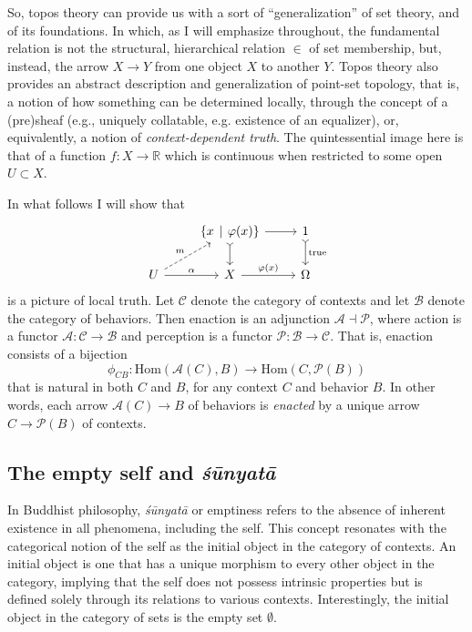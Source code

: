 \documentclass{article}
\begin{document}
So, topos theory can provide us with a sort of ``generalization'' of set theory, and of its foundations. In which, as I will emphasize throughout, the fundamental relation is not the structural, hierarchical relation $\in$ of set membership, but, instead, the arrow $X \to Y$ from one object $X$ to another $Y.$ Topos theory also provides an abstract description and generalization of point-set topology, that is, a notion of how something can be determined locally, through the concept of a (pre)sheaf (e.g., uniquely collatable, e.g. existence of an equalizer), or, equivalently, a notion of \emph{context-dependent truth}. The quintessential image here is that of a function $f \colon X \to \mathbb{R}$ which is continuous when restricted to some open $U \subset X$.

In what follows I will show that  
\[
\begin{tikzcd}
& \{ x \hspace{4px} | \hspace{4px} \varphi(x) \}  \arrow[r] \arrow[d, tail] & 1 \arrow[d, tail, "\text{true}"] \\
U \arrow[r, "\alpha"] \arrow[ru, dashed, "m"] & X \arrow[r, "\varphi(x)"] & \Omega
\end{tikzcd}
\]
is a picture of local truth. Let $\mathcal{C}$ denote the category of contexts and let $\mathcal{B}$ denote the category of behaviors. Then enaction is an adjunction $\mathcal{A} \dashv \mathcal{P}$, where action is a functor $\mathcal{A} \colon \mathcal{C} \to \mathcal{B}$ and perception is a functor $\mathcal{P} \colon \mathcal{B} \to \mathcal{C}$. That is, enaction consists of a bijection 
\[
\phi_{CB} \colon \text{Hom} ( \mathcal{A}(C), B ) \to \text{Hom}(C, \mathcal{P}(B))
\]
that is natural in both $C$ and $B$, for any context $C$ and behavior $B$. In other words, each arrow $\mathcal{A}(C) \to B$ of behaviors  is \emph{enacted} by a unique arrow $C \to \mathcal{P}(B)$ of contexts.

\subsection{The empty self and \emph{śūnyatā}} \label{sec:self}

In Buddhist philosophy, \emph{śūnyatā} or emptiness refers to the absence of inherent existence in all phenomena, including the self. This concept resonates with the categorical notion of the self as the initial object in the category of contexts. An initial object is one that has a unique morphism to every other object in the category, implying that the self does not possess intrinsic properties but is defined solely through its relations to various contexts. Interestingly, the initial object in the category of sets is the empty set $\emptyset$.
\end{document}
